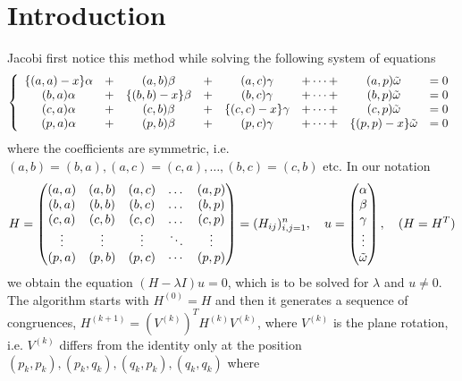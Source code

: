 \documentclass{article}
\begin{document}
\section{Introduction}
Jacobi first notice this method while solving the following system of equations
\begin{equation}\notag
  \left\{
    \begin{array}{cccccccc}
      \{(a, a)-x\} \alpha & + & (a, b) \beta & +
      & (a, c) \gamma & +\cdots+ & (a, p) \tilde{\omega} & =0 \\
      (b, a) \alpha & + & \{(b, b)-x\} \beta & +
      & (b, c) \gamma & +\cdots+ & (b, p) \tilde{\omega} & =0 \\
      (c, a) \alpha & + & (c, b) \beta & +
      & \{(c, c)-x\} \gamma & +\cdots+ & (c, p) \tilde{\omega} & =0 \\
      (p, a) \alpha & + & (p, b) \beta & +
      & (p, c) \gamma & +\cdots+ & \{(p, p)-x\} \tilde{\omega} & =0
    \end{array}
  \right.
\end{equation}
where the coefficients are symmetric, i.e. $(a,b) = (b,a), (a,c) = (c,a),
\dots, (b,c) = (c,b)$ etc. In our notation 
\begin{equation}\notag
  H =
  \begin{pmatrix}
    (a,a) & (a,b) & (a,c) & \dots & (a,p) \\
    (b,a) & (b,b) & (b,c) & \dots & (b,p) \\
    (c,a) & (c,b) & (c,c) & \dots & (c,p) \\
    \vdots {} & \vdots & \vdots & \ddots & \vdots \\
    (p,a) & (p,b) & (p,c) & \cdots & (p,p) 
  \end{pmatrix}  =  (H_{ij})^n_{i,j = 1} ,  
  \quad u =
  \begin{pmatrix}
    \alpha \\ \beta \\ \gamma \\ \vdots \\ \tilde \omega 
  \end{pmatrix}, \quad
  (H = H^T)
\end{equation}
we obtain the equation $(H - \lambda I)u = 0$, which is to be solved for
$\lambda$ and $u\neq 0$. The algorithm starts with $H^{(0)} = H$ and then
it generates a sequence of congruences, $H^{(k+1)} =
(V^{(k)})^TH^{(k)}V^{(k)}$, where $V^{(k)}$ is the plane rotation,
i.e. $V^{(k)}$ differs from the identity only at the position $(p_k,p_k),
(p_k,q_k),(q_k,p_k),(q_k,q_k)$ where
\end{document}
